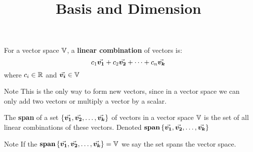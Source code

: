 \documentclass{beamer}
\title[MA245 - Section 3.6]{Basis and Dimension}
\begin{document}
\begin{frame}
  \titlepage
\end{frame}

\begin{frame}
\begin{definition}
For a vector space $\mathbb{V}$, a \textbf{linear combination} of vectors is:
\begin{equation*}
c_1{\vec{\boldsymbol{v_1}}}+c_2{\vec{\boldsymbol{v_2}}}+\cdots+c_n{\vec{\boldsymbol{v_k}}}
\end{equation*}
where $c_i\in\mathbb{R}$ and ${\vec{\boldsymbol{v_i}}}\in\mathbb{V}$
\end{definition}\pause
\begin{block}{Note}
This is the only way to form new vectors, since in a vector space we can only add two vectors or multiply a vector by a scalar.
\end{block}\pause
\begin{definition}
The \textbf{span} of a set $\left\{{\vec{\boldsymbol{v_1}}}, {\vec{\boldsymbol{v_2}}}, \ldots, {\vec{\boldsymbol{v_k}}}\right\}$ of vectors in a vector space $\mathbb{V}$ is the set of all linear combinations of these vectors. Denoted $\operatorname{\textbf{span}}\left\{{\vec{\boldsymbol{v_1}}}, {\vec{\boldsymbol{v_2}}}, \dots, {\vec{\boldsymbol{v_k}}}\right\}$
\end{definition}\pause
\begin{block}{Note}
If the $\operatorname{\textbf{span}}\left\{{\vec{\boldsymbol{v_1}}}, {\vec{\boldsymbol{v_2}}}, \dots, {\vec{\boldsymbol{v_k}}}\right\}=\mathbb{V}$ we say the set spans the vector space.
\end{block}
\end{frame}
\end{document}
